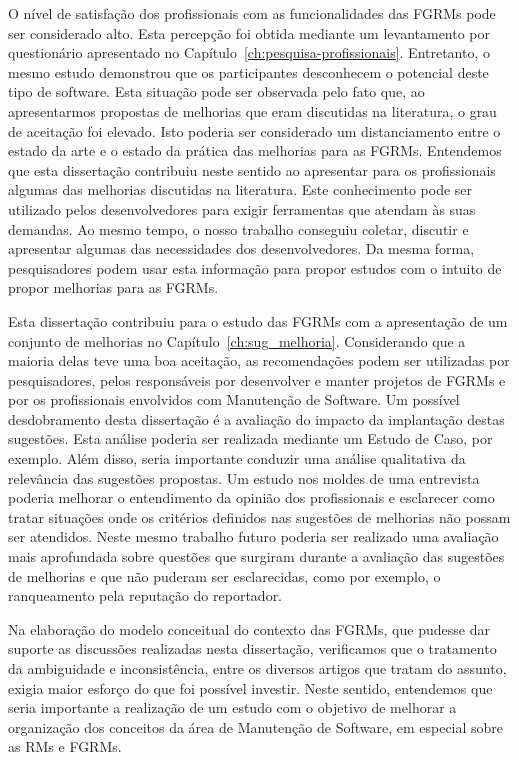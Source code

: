 O nível de satisfação dos profissionais com as funcionalidades das FGRMs pode
ser considerado alto. Esta percepção foi obtida mediante um levantamento por
questionário apresentado no Capítulo~\ref{ch:pesquisa-profissionais}.
Entretanto, o mesmo estudo demonstrou que os participantes desconhecem o
potencial deste tipo de software. Esta situação pode ser observada pelo fato
que, ao apresentarmos propostas de melhorias que eram discutidas na literatura,
o grau de aceitação foi elevado. Isto poderia ser considerado um distanciamento
entre o estado da arte e o estado da prática das melhorias para as FGRMs.
Entendemos que esta dissertação contribuiu neste sentido ao apresentar para os
profissionais algumas das melhorias discutidas na literatura. Este conhecimento
pode ser utilizado pelos desenvolvedores para exigir ferramentas que atendam às
suas demandas. Ao mesmo tempo, o nosso trabalho conseguiu coletar, discutir e
apresentar algumas das necessidades dos desenvolvedores. Da mesma forma,
pesquisadores podem usar esta informação para propor estudos com o intuito de
propor melhorias para as FGRMs.

Esta dissertação contribuiu para o estudo das FGRMs com a apresentação de um
conjunto de melhorias no Capítulo~\ref{ch:sug_melhoria}. Considerando que a
maioria delas teve uma boa aceitação, as recomendações podem ser utilizadas por
pesquisadores, pelos responsáveis por desenvolver e manter projetos de FGRMs e
por os profissionais envolvidos com Manutenção de Software. Um possível
desdobramento desta dissertação é a avaliação do impacto da implantação destas
sugestões. Esta análise poderia ser realizada mediante um Estudo de Caso, por
exemplo. Além disso, seria importante conduzir uma análise qualitativa da
relevância das sugestões propostas. Um estudo nos moldes de uma entrevista
poderia melhorar o entendimento da opinião dos profissionais e esclarecer como
tratar situações onde os critérios definidos nas sugestões de melhorias não
possam ser atendidos. Neste mesmo trabalho futuro poderia ser realizado uma
avaliação mais aprofundada sobre questões que surgiram durante a avaliação das
sugestões de melhorias e que não puderam ser esclarecidas, como por exemplo, o
ranqueamento pela reputação do reportador.

Na elaboração do modelo conceitual do contexto das FGRMs, que pudesse dar
suporte as discussões realizadas nesta dissertação, verificamos que o
tratamento da ambiguidade e inconsistência, entre os diversos artigos que
tratam do assunto, exigia maior esforço do que foi possível investir. Neste
sentido, entendemos que seria importante a realização de um estudo com o
objetivo de melhorar a organização dos conceitos da área de Manutenção de
Software, em especial sobre as RMs e FGRMs.

